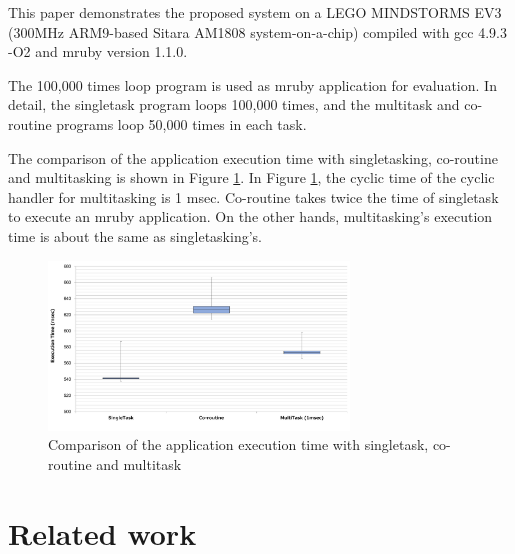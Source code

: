 \documentclass[conference,compsoc]{IEEEtran}
\begin{document}
This paper demonstrates the proposed system on a LEGO MINDSTORMS EV3 (300MHz ARM9-based Sitara AM1808 system-on-a-chip) compiled with gcc 4.9.3 -O2 and mruby version 1.1.0.

The 100,000 times loop program is used as mruby application for evaluation.
In detail, the singletask program loops 100,000 times, and the multitask and co-routine programs loop 50,000 times in each task.

The comparison of the application execution time with singletasking, co-routine and multitasking is shown in Figure \ref{fig:comparison_s_c_m}.
In Figure \ref{fig:comparison_s_c_m}, the cyclic time of the cyclic handler for multitasking is 1 msec.
Co-routine takes twice the time of singletask to execute an mruby application.
On the other hands, multitasking's execution time is about the same as singletasking's.

\begin{figure}[t]
    \centering
    \includegraphics[width=8cm,clip]{figure/comparison_s_c_m.pdf}
    \caption{Comparison of the application execution time with singletask, co-routine and multitask}
    \label{fig:comparison_s_c_m}
\end{figure}

\section{Related work}
\label{sec:Related work}
\end{document}
